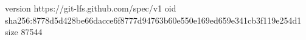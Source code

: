 version https://git-lfs.github.com/spec/v1
oid sha256:8778d5d428be66dacce6f8777d94763b60e550e169ed659e341cb3f119e254d1
size 87544
